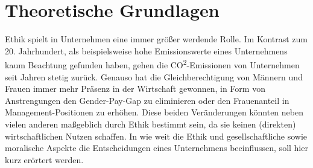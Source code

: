 \documentclass[12pt]{article}
\begin{document}
\renewcommand{\mytitle}{Governanceethik und\\moralische Anreize}%
\renewcommand{\myauthor}{Lennart Schulte-Kellinghaus,\\Timo Stovermann}%
\renewcommand{\headheight}{27pt}%

%

\clearpage
\frontmatter%


\renewcommand{\plaintitle}{Tabellenverzeichnis}%
{\def\makebox[#1][#2]#3{#3}%
	\listoftables 
}

\clearpage

\renewcommand{\plaintitle}{Inhaltsverzeichnis}%
{\def\makebox[#1][#2]#3{#3}%
	\tableofcontents
}


\clearpage
\mainmatter%

\part{Theoretische Grundlagen}
Ethik spielt in Unternehmen eine immer größer werdende Rolle. Im Kontrast zum 20. Jahrhundert, als beispielsweise hohe Emissionswerte eines Unternehmens kaum Beachtung gefunden haben, gehen die CO\textsuperscript{2}-Emissionen von Unternehmen seit Jahren stetig zurück. Genauso hat die Gleichberechtigung von Männern und Frauen immer mehr Präsenz in der Wirtschaft gewonnen, in Form von Anstrengungen den Gender-Pay-Gap zu eliminieren oder den Frauenanteil in Management-Positionen zu erhöhen. Diese beiden Veränderungen könnten neben vielen anderen maßgeblich durch Ethik bestimmt sein, da sie keinen (direkten) wirtschaftlichen Nutzen schaffen. In wie weit die Ethik und gesellschaftliche sowie moralische Aspekte die Entscheidungen eines Unternehmens beeinflussen, soll hier kurz erörtert werden.
\end{document}
